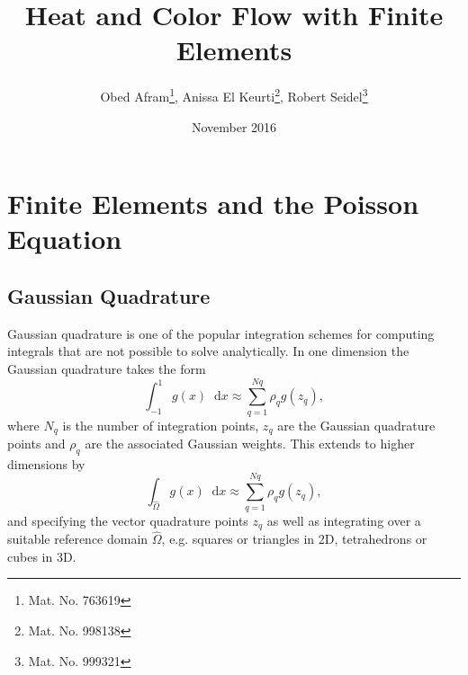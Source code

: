 \documentclass{report}
\renewcommand*\d{\mathop{}\!\mathrm{d}}
\begin{document}

\lstset{language=Matlab}

\title{Heat and Color Flow with Finite Elements}
\author{Obed Afram\footnote{Mat. No. 763619}, Anissa El Keurti\footnote{Mat. No. 998138}, Robert Seidel\footnote{Mat. No. 999321}}
\date{November 2016}
\maketitle

\tableofcontents

\listoftables

\listoffigures

\chapter{Finite Elements and the Poisson Equation}


\section{Gaussian Quadrature}

Gaussian quadrature is one of the popular integration schemes for computing integrals that are not possible to solve analytically. In one dimension the Gaussian quadrature takes the form
\begin{equation}
	\int_{-1}^{1} g(x)\d x\approx\sum_{q=1}^{Nq} \rho_q g(z_q),
\end{equation}
where $N_q$ is the number of integration points, $z_q$ are the Gaussian quadrature points and $\rho_q$ are the associated Gaussian weights. This extends to higher dimensions by
\begin{equation}
	\int_{\hat{\Omega}} g({x}) \d x\approx\sum_{q=1}^{Nq} \rho_q g(z_q),
\end{equation}
and specifying the vector quadrature points $z_q$ as well as integrating over a suitable reference domain $\hat{\Omega}$, e.g. squares or triangles in 2D, tetrahedrons or cubes in 3D.
\end{document}
